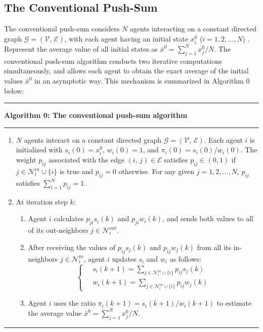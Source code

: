 \documentclass{IEEEtran}
\begin{document}
\subsection{The Conventional Push-Sum}

The conventional push-sum considers $N$ agents interacting on a constant directed graph $\mathcal{G}=(\mathcal{V}, \, \mathcal{E})$, with each agent having an initial state $x_i^0$ ($i=1,2,\ldots,N$) \cite{kempe2003gossip, benezit2010weighted}. Represent the average value of all initial states as $\bar{x}^0={\sum_{j=1}^{N}x_j^0}/N$. The conventional push-sum algorithm conducts two iterative computations simultaneously, and allows each agent to obtain the exact average of the initial values $\bar{x}^0$ in an asymptotic way. This mechanism is summarized in Algorithm 0 below:

\noindent\rule{0.49\textwidth}{0.5pt}
\noindent\textbf{Algorithm 0: The conventional push-sum algorithm}

\vspace{-0.2cm}\noindent\rule{0.49\textwidth}{0.5pt}
\begin{enumerate}
	\item $N$ agents interact on a constant directed graph $\mathcal{G}=(\mathcal{V}, \, \mathcal{E})$. Each agent $i$ is initialized with $s_i(0)=x_i^0$, $w_i(0)=1$, and $\pi_i(0)=s_i(0)/w_i(0)$. The weight $p_{ij}$ associated with the edge $(i, \, j) \in \mathcal{E}$ satisfies $p_{ij} \in (0,1)$ if $j\in \mathcal{N}_i^{in}\cup \{i\}$ is true and $p_{ij} =0$ otherwise. For any given $j=1, 2, \ldots, N$, $p_{ij}$ satisfies $\sum_{i=1}^N p_{ij}=1$.
	\item At iteration step $k$:
	\begin{enumerate}
		\item Agent $i$ calculates $p_{ji} s_i(k)$ and $p_{ji} w_i(k)$, and sends both values to all of its out-neighbors $j \in \mathcal{N}_i^{out}$.
		\item After receiving the values of $p_{ij} s_j(k)$ and $p_{ij} w_j(k)$ from all its in-neighbors $j \in \mathcal{N}_i^{in}$, agent $i$ updates $s_i$ and $w_i$ as follows:
		\begin{equation}\label{conventional_push_sum}
		\left\lbrace \begin{aligned}
		& \ s_i(k+1) = \sum_{j\in \mathcal{N}_i^{in}\cup \{i\}} p_{ij}s_j(k)\\
		& \ w_i(k+1) = \sum_{j\in \mathcal{N}_i^{in}\cup \{i\}} p_{ij}w_j(k)
		\end{aligned} \right.
		\end{equation}	
		\item Agent $i$ uses the ratio $\pi_i(k+1)=s_i(k+1)/w_i(k+1)$ to estimate the average value $\bar{x}^0={\sum_{j=1}^{N}x_j^0}/N$.
	\end{enumerate}
\end{enumerate}
\vspace{-0.2cm}\rule{0.49\textwidth}{0.5pt}	
\end{document}
